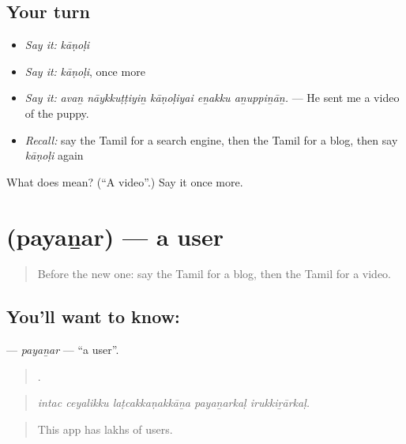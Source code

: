 \subsection*{Your turn}
\begin{itemize}
\raggedright
  \item \emph{Say it:} \emph{kāṇoḷi}
  \item \emph{Say it:} \emph{kāṇoḷi}, once more
  \item \emph{Say it:} \emph{avaṉ nāykkuṭṭiyiṉ kāṇoḷiyai eṉakku aṉuppiṉāṉ.} — He sent me a video of the puppy.
  \item \emph{Recall:} say the Tamil for a search engine, then the Tamil for a blog, then say \emph{kāṇoḷi} again
\end{itemize}

\begin{tcolorbox}[breakable,colback=teal!4,colframe=teal!35!black,title={Before you move on}]
What does  mean? (\textquotedblleft{}A video\textquotedblright{}.) Say it once more.
\end{tcolorbox}
\section[\texorpdfstring{\ta{பயனர்} (payaṉar)}{பயனர் (payaṉar)}]{ (payaṉar) — a user}

\label{lesson:TA-C516-payanar}



\begin{quote}
Before the new one: say the Tamil for a blog, then the Tamil for a video.
\end{quote}

\subsection*{You'll want to know: }
\textbf{} — \emph{payaṉar} — \textquotedblleft{}a user\textquotedblright{}.

\begin{quote}
    .
\end{quote}

\begin{quote}
\emph{intac ceyalikku laṭcakkaṇakkāṉa payaṉarkaḷ irukkiṟārkaḷ.}
\end{quote}

\begin{quote}
This app has lakhs of users.
\end{quote}

